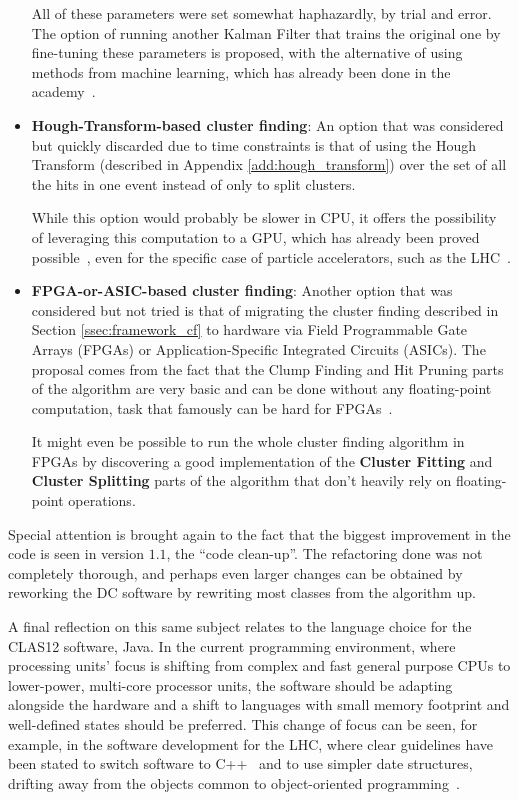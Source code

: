 \begin{itemize}
        All of these parameters were set somewhat haphazardly, by trial and error.
        The option of running another Kalman Filter that trains the original one by fine-tuning these parameters is proposed, with the alternative of using methods from machine learning, which has already been done in the academy~\cite{abbeel2005discriminative}.
        
        \item \textbf{Hough-Transform-based cluster finding}: An option that was considered but quickly discarded due to time constraints is that of using the Hough Transform (described in Appendix \ref{add:hough_transform}) over the set of all the hits in one event instead of only to split clusters.
        
        While this option would probably be slower in CPU, it offers the possibility of leveraging this computation to a GPU, which has already been proved possible~\cite{braak2011fast}, even for the specific case of particle accelerators, such as the LHC~\cite{halyo2013gpu}.
        
        \item \textbf{FPGA-or-ASIC-based cluster finding}: Another option that was considered but not tried is that of migrating the cluster finding described in Section \ref{ssec:framework_cf} to hardware via Field Programmable Gate Arrays (FPGAs) or Application-Specific Integrated Circuits (ASICs).
        The proposal comes from the fact that the Clump Finding and Hit Pruning parts of the algorithm are very basic and can be done without any floating-point computation, task that famously can be hard for FPGAs~\cite{fagin1994field}.
        
        It might even be possible to run the whole cluster finding algorithm in FPGAs by discovering a good implementation of the \textbf{Cluster Fitting} and \textbf{Cluster Splitting} parts of the algorithm that don't heavily rely on floating-point operations.
    \end{itemize}

Special attention is brought again to the fact that the biggest improvement in the code is seen in version $1.1$, the ``code clean-up''.
The refactoring done was not completely thorough, and perhaps even larger changes can be obtained by reworking the DC software by rewriting most classes from the algorithm up.

\newpage

A final reflection on this same subject relates to the language choice for the CLAS12 software, Java.
In the current programming environment, where processing units' focus is shifting from complex and fast general purpose CPUs to lower-power, multi-core processor units, the software should be adapting alongside the hardware and a shift to languages with small memory footprint and well-defined states should be preferred.
This change of focus can be seen, for example, in the software development for the LHC, where clear guidelines have been stated to switch software to C++~\cite{foundation2017roadmap} and to use simpler date structures, drifting away from the objects common to object-oriented programming~\cite{cerati2016kalman}.

